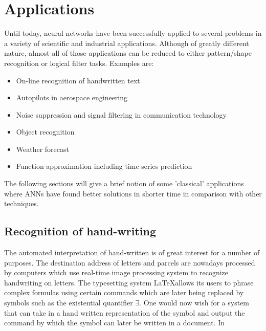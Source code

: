 \documentclass[10pt,a4paper,DIV=11]{scrreprt}
\begin{document}
\section{Applications}
\label{sec:exp}
Until today, neural networks have been successfully applied to several problems in a variety of scientific and industrial applications. Although of greatly different nature, almost all of those applications can be reduced to either pattern/shape recognition or logical filter tasks. Examples are:\\
\begin{itemize}
    \item On-line recognition of handwritten text
    \item Autopilots in aerospace engineering
    \item Noise suppression and signal filtering in communication technology 
    \item Object recognition
    \item Weather forecast
    \item Function approximation including time series prediction
\end{itemize}

The following sections will give a brief notion of some 'classical' applications where ANNs have found better solutions in shorter time in comparison with other techniques.
\subsection{Recognition of hand-writing}
The automated interpretation of hand-written is of great interest for a number of purposes. The destination address of letters and parcels are nowadays processed by computers which use real-time image processing system to recognize handwriting on letters. The typesetting system \LaTeX  allows its users to phrase complex formulas using certain commands which are later being replaced by symbols such as the existential quantifier $\exists$. 
One would now wish for a system that can take in a hand written representation of the symbol and output the command by which the symbol can later be written in a document. In %
\\
\end{document}

